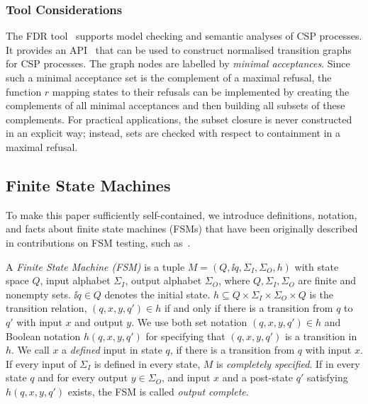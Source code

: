 \subsubsection*{Tool Considerations}
The FDR tool~\cite{fdr} supports model checking and semantic analyses of CSP processes.
It provides an API~\cite{fdrmanual} that can be used to construct normalised transition graphs for CSP processes. The graph  nodes are labelled by \emph{minimal acceptances}. Since such a minimal acceptance set is the complement of a maximal refusal, the function $r$ mapping states
to their refusals can be implemented by creating the complements of all minimal acceptances
and then building all subsets of these complements. For practical applications, 
the subset closure is never constructed in an explicit way; instead, sets are checked 
with respect to containment in a maximal refusal.

%




\subsection{Finite State Machines}


To make this paper sufficiently self-contained, we introduce definitions, notation, and facts
about 
finite state machines (FSMs) that have been originally described in contributions on FSM testing, such as~\cite{petrenko_testing_2011,DBLP:conf/hase/PetrenkoY14,hierons_testing_2004}.

A \emph{Finite State Machine (FSM)} is  a tuple
 $M=(Q, \ii{q}, \Sigma_I, \Sigma_O,  h)$   with state space $Q$, input alphabet $\Sigma_I$, 
 output alphabet $\Sigma_O$, where $Q,\Sigma_I,\Sigma_O$ are finite and nonempty sets. $\ii{q}\in Q$ denotes the initial state. 
$h\subseteq Q\times \Sigma_I \times \Sigma_O\times Q$ is the  transition relation,  $(q,x,y,q')\in h$ if and only if there is a transition from $q$ to $q'$ with input $x$ and output $y$. 
We use  both set notation $(q,x,y,q')\in h$ and Boolean notation $h(q,x,y,q')$ for specifying
that $(q,x,y,q')$ is a transition in $h$.
We call $x$ a \emph{defined} input in state $q$, if there is a transition from $q$  with input $x$. 
If every input of $\Sigma_I$ is defined in every state, $M$ is \emph{completely specified}.
If in every state $q$ and for every output $y\in\Sigma_O$, and input $x$ and a post-state 
$q'$ satisfying $h(q,x,y,q')$ exists, the FSM is called \emph{output complete}.



